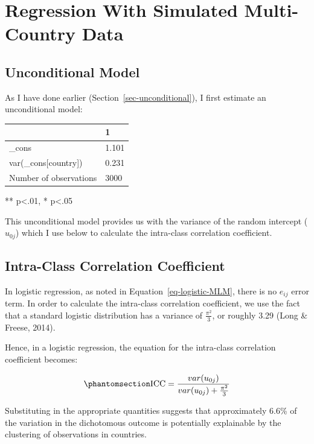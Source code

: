 \documentclass[
  letterpaper,
  DIV=11,
  numbers=noendperiod]{scrreprt}
\begin{document}
\section{Regression With Simulated Multi-Country
Data}\label{sec-logistic-regression}

\subsection{Unconditional Model}\label{unconditional-model}

As I have done earlier (Section~\ref{sec-unconditional}), I first
estimate an unconditional model:

\begin{longtable}[]{@{}ll@{}}
\toprule\noalign{}
& 1 \\
\midrule\noalign{}
\endhead
\bottomrule\noalign{}
\endlastfoot
\_cons & 1.101 \\
var(\_cons{[}country{]}) & 0.231 \\
Number of observations & 3000 \\
\end{longtable}

** p\textless.01, * p\textless.05

This unconditional model provides us with the variance of the random
intercept (\(u_{0j}\)) which I use below to calculate the intra-class
correlation coefficient.

\subsection{Intra-Class Correlation
Coefficient}\label{intra-class-correlation-coefficient}

In logistic regression, as noted in Equation~\ref{eq-logistic-MLM},
there is no \(e_{ij}\) error term. In order to calculate the intra-class
correlation coefficient, we use the fact that a standard logistic
distribution has a variance of \(\frac{\pi^2}{3}\), or roughly 3.29
(Long \& Freese, 2014).

Hence, in a logistic regression, the equation for the intra-class
correlation coefficient becomes:

\begin{equation}\phantomsection\label{eq-ICC-logistic}{\text{ICC} = \frac{var(u_{0j})}{var(u_{0j}) + \frac{\pi^2}{3}}}\end{equation}

Substituting in the appropriate quantities suggests that approximately
6.6\% of the variation in the dichotomous outcome is potentially
explainable by the clustering of observations in countries.
\end{document}
